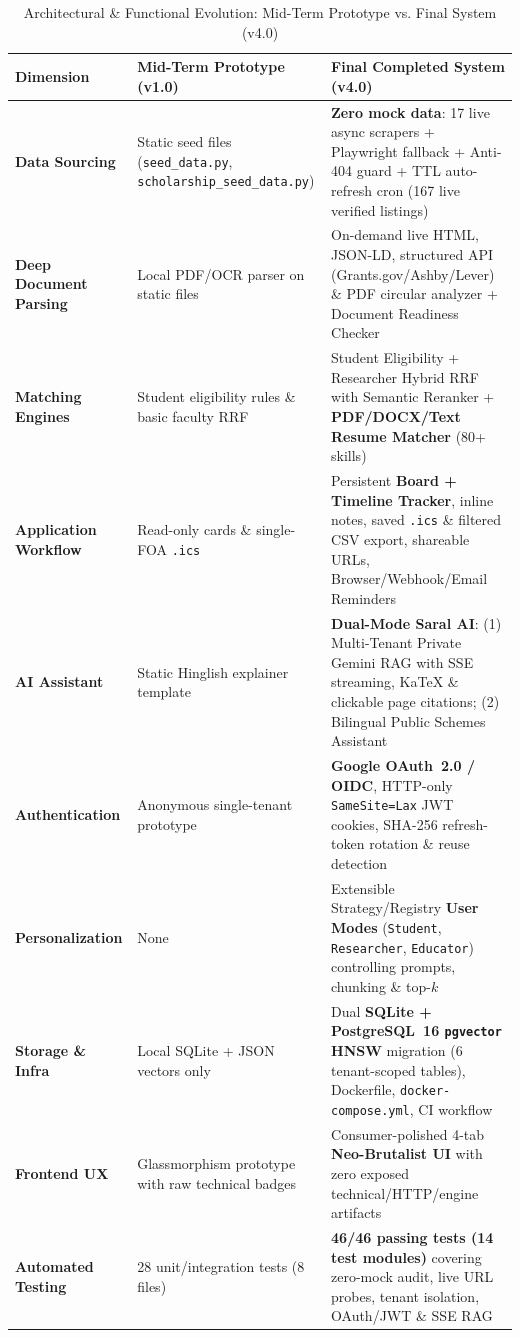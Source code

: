 \documentclass[12pt,a4paper,oneside]{report}
\begin{document}
\begin{table}[htbp]
    \centering
    \caption{Architectural \& Functional Evolution: Mid-Term Prototype vs. Final System (v4.0)}
    \label{tab:evolution}
    \footnotesize
    \begin{tabularx}{\textwidth}{>{\bfseries}lXX}
        \toprule
        Dimension & Mid-Term Prototype (v1.0) & Final Completed System (v4.0) \\
        \midrule
        Data Sourcing & Static seed files (\texttt{seed\_data.py}, \texttt{scholarship\_seed\_data.py}) & \textbf{Zero mock data}: 17 live async scrapers + Playwright fallback + Anti-404 guard + TTL auto-refresh cron (167 live verified listings) \\
        Deep Document Parsing & Local PDF/OCR parser on static files & On-demand live HTML, JSON-LD, structured API (Grants.gov/Ashby/Lever) \& PDF circular analyzer + Document Readiness Checker \\
        Matching Engines & Student eligibility rules \& basic faculty RRF & Student Eligibility + Researcher Hybrid RRF with Semantic Reranker + \textbf{PDF/DOCX/Text Resume Matcher} (80+ skills) \\
        Application Workflow & Read-only cards \& single-FOA \texttt{.ics} & Persistent \textbf{Board + Timeline Tracker}, inline notes, saved \texttt{.ics} \& filtered CSV export, shareable URLs, Browser/Webhook/Email Reminders \\
        AI Assistant & Static Hinglish explainer template & \textbf{Dual-Mode Saral AI}: (1) Multi-Tenant Private Gemini RAG with SSE streaming, KaTeX \& clickable page citations; (2) Bilingual Public Schemes Assistant \\
        Authentication & Anonymous single-tenant prototype & \textbf{Google OAuth~2.0 / OIDC}, HTTP-only \texttt{SameSite=Lax} JWT cookies, SHA-256 refresh-token rotation \& reuse detection \\
        Personalization & None & Extensible Strategy/Registry \textbf{User Modes} (\texttt{Student}, \texttt{Researcher}, \texttt{Educator}) controlling prompts, chunking \& top-$k$ \\
        Storage \& Infra & Local SQLite + JSON vectors only & Dual \textbf{SQLite + PostgreSQL~16 \texttt{pgvector} HNSW} migration (6 tenant-scoped tables), Dockerfile, \texttt{docker-compose.yml}, CI workflow \\
        Frontend UX & Glassmorphism prototype with raw technical badges & Consumer-polished 4-tab \textbf{Neo-Brutalist UI} with zero exposed technical/HTTP/engine artifacts \\
        Automated Testing & 28 unit/integration tests (8 files) & \textbf{46/46 passing tests (14 test modules)} covering zero-mock audit, live URL probes, tenant isolation, OAuth/JWT \& SSE RAG \\
        \bottomrule
    \end{tabularx}
\end{table}
\end{document}
